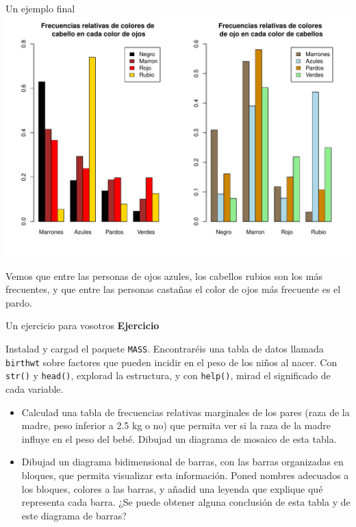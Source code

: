 \documentclass[
  ignorenonframetext,
  aspectratio=169]{beamer}
\begin{document}
\begin{frame}{Un ejemplo final}
\protect\hypertarget{un-ejemplo-final-8}{}
\includegraphics{Hora3_files/figure-beamer/unnamed-chunk-54-1.pdf}

Vemos que entre las personas de ojos azules, los cabellos rubios son los
más frecuentes, y que entre las personas castañas el color de ojos más
frecuente es el pardo.
\end{frame}

\begin{frame}[fragile]{Un ejercicio para vosotros}
\protect\hypertarget{un-ejercicio-para-vosotros}{}
\textbf{Ejercicio}

Instalad y cargad el paquete \texttt{MASS}. Encontraréis una tabla de
datos llamada \texttt{birthwt} sobre factores que pueden incidir en el
peso de los niños al nacer. Con \texttt{str()} y \texttt{head()},
explorad la estructura, y con \texttt{help()}, mirad el significado de
cada variable.

\begin{itemize}
\item
  Calculad una tabla de frecuencias relativas marginales de los pares
  (raza de la madre, peso inferior a 2.5 kg o no) que permita ver si la
  raza de la madre influye en el peso del bebé. Dibujad un diagrama de
  mosaico de esta tabla.
\item
  Dibujad un diagrama bidimensional de barras, con las barras
  organizadas en bloques, que permita visualizar esta información. Poned
  nombres adecuados a los bloques, colores a las barras, y añadid una
  leyenda que explique qué representa cada barra. ¿Se puede obtener
  alguna conclusión de esta tabla y de este diagrama de barras?
\end{itemize}
\end{frame}
\end{document}
